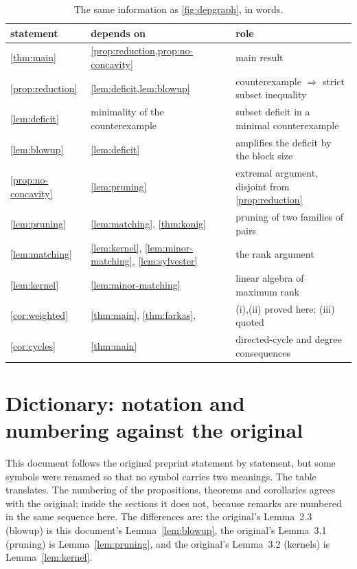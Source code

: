 \begin{table}[ht]
\centering
\small
\renewcommand{\arraystretch}{1.2}
\begin{tabular}{@{}llp{6.2cm}@{}}
\toprule
statement & depends on & role \\
\midrule
\cref{thm:main} & \cref{prop:reduction,prop:no-concavity} & main result \\
\cref{prop:reduction} & \cref{lem:deficit,lem:blowup} & counterexample $\Rightarrow$ strict subset inequality \\
\cref{lem:deficit} & minimality of the counterexample & subset deficit in a minimal counterexample \\
\cref{lem:blowup} & \cref{lem:deficit} & amplifies the deficit by the block size \\
\cref{prop:no-concavity} & \cref{lem:pruning} & extremal argument, disjoint from \cref{prop:reduction} \\
\cref{lem:pruning} & \cref{lem:matching}, \cref{thm:konig} & pruning of two families of pairs \\
\cref{lem:matching} & \cref{lem:kernel}, \cref{lem:minor-matching}, \cref{lem:sylvester} & the rank argument \\

\cref{lem:kernel} & \cref{lem:minor-matching} & linear algebra of maximum rank \\
\cref{cor:weighted} & \cref{thm:main}, \cref{thm:farkas}, \cite{Seacrest2015} & (i),(ii) proved here; (iii) quoted \\
\cref{cor:cycles} & \cref{thm:main} & directed-cycle and degree consequences \\
\bottomrule
\end{tabular}
\caption{The same information as \cref{fig:depgraph}, in words.}
\label{tab:dep}
\end{table}

\section{Dictionary: notation and numbering against the original}\label{app:dictionary}

This document follows the original preprint statement by statement, but some symbols were renamed so
that no symbol carries two meanings. The table translates. The numbering of the propositions,
theorems and corollaries agrees with the original; inside the sections it does not, because remarks
are numbered in the same sequence here. The differences are: the original's Lemma~2.3 (blowup) is
this document's Lemma~\ref{lem:blowup}, the original's Lemma~3.1 (pruning) is
Lemma~\ref{lem:pruning}, and the original's Lemma~3.2 (kernels) is Lemma~\ref{lem:kernel}.

